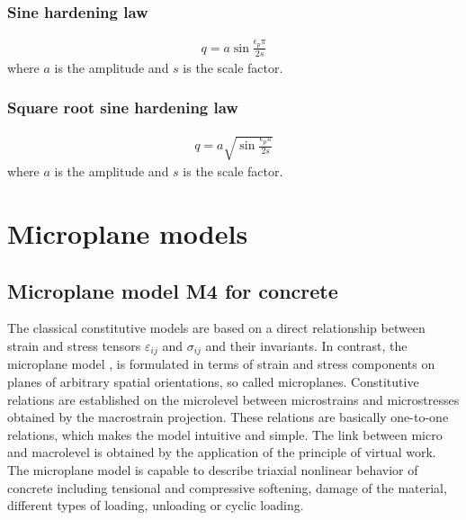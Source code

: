 \subsubsection{Sine hardening law}
\begin{eqnarray}
q = a \sin{\frac{\epsilon_p \pi}{2s}}
\end{eqnarray}
where $a$ is the amplitude and $s$ is the scale factor.

\subsubsection{Square root sine hardening law}
\begin{eqnarray}
q = a \sqrt{\sin{\frac{\epsilon_p \pi}{2s}}}
\end{eqnarray}
where $a$ is the amplitude and $s$ is the scale factor.



\section{Microplane models}

\subsection{Microplane model M4 for concrete}

The classical constitutive models are based on a direct relationship 
between strain and stress tensors $\varepsilon_{ij}$ and $\sigma_{ij}$ and their invariants. 
In contrast, the microplane model \cite{bazant1}, \cite{bazant2}
is formulated in terms of strain and stress components on planes of arbitrary spatial orientations, so called microplanes.
Constitutive relations are established on the microlevel between microstrains and microstresses obtained by the macrostrain
projection. These relations are basically one-to-one relations, which makes the model intuitive and simple.
The link between micro and macrolevel is obtained by the application of the principle of virtual work.
The microplane model is capable to describe triaxial nonlinear behavior of concrete including tensional and
compressive softening, damage of the material, different types of loading, unloading or cyclic loading.

